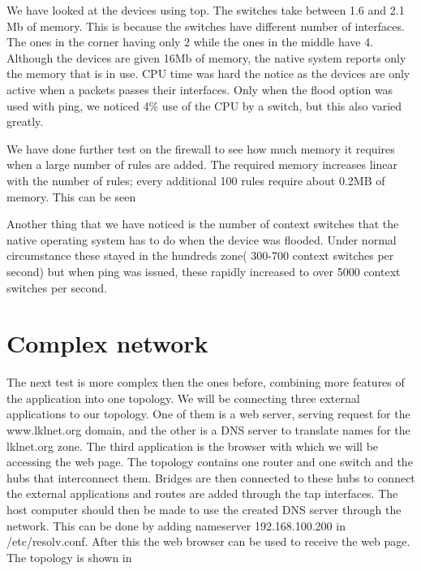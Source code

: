 We have looked at the devices using top. The switches take between 1.6 and 2.1 Mb of memory. This is
because the switches have different number of interfaces. The ones in the corner having only 2 while
the ones in the middle have 4. Although the devices are given 16Mb of memory, the native system 
reports only the memory that is in use. CPU time was hard the notice as the devices are only active
when a packets passes their interfaces. Only when the flood option was used with ping, we noticed
4\% use of the CPU by a switch, but this also varied greatly. 

We have done further test on the firewall to see how much memory it requires when a large number
of rules are added. The required memory increases linear with the number of rules; every additional
100 rules require about 0.2MB of memory. This can be seen 

Another thing that we have noticed is the number of context switches that the native operating
system has to do when the device was flooded. Under normal circumstance these stayed in the hundreds
zone( 300-700 context switches per second) but when ping was issued, these rapidly increased to over
5000 context switches per second.


\section{Complex network}
\label{sec:complex-network}

The next test is more complex then the ones before, combining more features of the application into
one topology. We will be connecting three external applications to our \textbf{\project} topology. One of
them is a web server, serving request for the www.lklnet.org domain, and the other is a DNS server to
translate names for the lklnet.org zone. The third application is the browser with which we will
be accessing the web page. The \textbf{\project} topology contains one router and one switch and the hubs
that interconnect them. Bridges are then connected to these hubs to connect the external applications and
routes are added through the tap interfaces. The host computer should then be made to use the created
DNS server through the \textbf{\project} network. This can be done by adding nameserver 192.168.100.200
in /etc/resolv.conf. After this the web browser can be used to receive the web page. The topology is shown
in 

